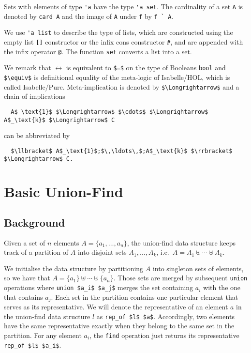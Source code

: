 \documentclass[
  sigplan,
  10pt,
  anonymous,
  review,
  ]{acmart}
\begin{document}
Sets with elements of type \lstinline!'a! have the type \lstinline!'a set!.
The cardinality of a set \lstinline!A! is denoted by \lstinline!card A! and the image of \lstinline!A! under \lstinline!f! by \lstinline!f ` A!.

We use \lstinline!'a list! to describe the type of lists, which are constructed using the empty list \lstinline![]! constructor or the infix cons constructor \lstinline!#!, and are appended with the infix operator \lstinline!@!.
The function \lstinline!set! converts a list into a set.

We remark that $\longleftrightarrow$ is equivalent to \lstinline!$=$! on the type of Booleans \lstinline!bool! and \lstinline!$\equiv$! is definitional equality of the meta-logic of Isabelle/HOL, which is called Isabelle/Pure.
Meta-implication is denoted by \lstinline!$\Longrightarrow$! and a chain of implications
\begin{lstlisting}
  A$_\text{1}$ $\Longrightarrow$ $\cdots$ $\Longrightarrow$ A$_\text{k}$ $\Longrightarrow$ C
\end{lstlisting}
can be abbreviated by 
\begin{lstlisting}
  $\llbracket$ A$_\text{1}$;$\,\ldots\,$;A$_\text{k}$ $\rrbracket$ $\Longrightarrow$ C.
\end{lstlisting}

\section{Basic Union-Find}
\subsection{Background}
Given a set of $n$ elements $A = \{a_1, \ldots, a_n\}$, the union-find data structure keeps track of a partition of $A$ into disjoint sets $A_1, \ldots, A_k$, i.e.\ $A = A_1 \uplus \cdots \uplus A_k$.

We initialise the data structure by partitioning $A$ into singleton sets of elements,
so we have that $A = \{a_1\} \uplus \cdots \uplus \{a_n\}$.
Those sets are merged by subsequent \lstinline!union! operations where \lstinline!union $a_i$ $a_j$! merges the set containing $a_i$ with the one that contains $a_j$.
Each set in the partition contains one particular element that serves as its representative.
We will denote the representative of an element $a$ in the union-find data structure $l$ as \lstinline!rep_of $l$ $a$!.
Accordingly, two elements have the same representative exactly when they belong to the same set in the partition.
For any element $a_i$, the \lstinline!find! operation just returns its representative \lstinline!rep_of $l$ $a_i$!.
\end{document}
